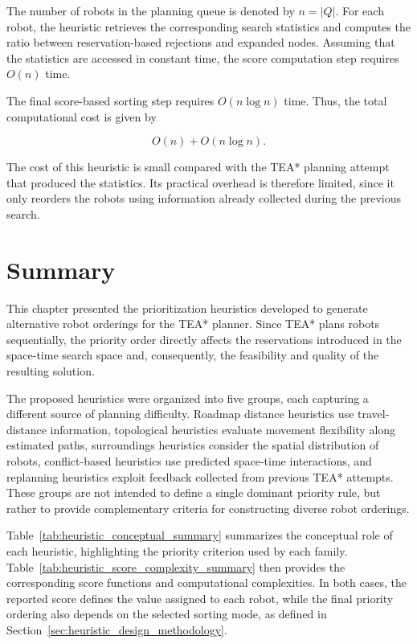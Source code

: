The number of robots in the planning queue is denoted by \(n = |Q|\). For each robot, the heuristic retrieves the corresponding search statistics and computes the ratio between reservation-based rejections and expanded nodes. Assuming that the statistics are accessed in constant time, the score computation step requires \(O(n)\) time.

The final score-based sorting step requires \(O(n \log n)\) time. Thus, the total computational cost is given by

\begin{equation}
\label{eq:exploration_conflicts_pressure_complexity}
    O(n) + O(n \log n).
\end{equation}

The cost of this heuristic is small compared with the TEA* planning attempt that produced the statistics. Its practical overhead is therefore limited, since it only reorders the robots using information already collected during the previous search.


\section{Summary}
\label{sec:heuristics_summary}
\hspace{\parindent}
This chapter presented the prioritization heuristics developed to generate alternative robot
orderings for the TEA* planner. Since TEA* plans robots sequentially, the priority order directly
affects the reservations introduced in the space-time search space and, consequently, the feasibility
and quality of the resulting solution.

The proposed heuristics were organized into five groups, each capturing a different source of
planning difficulty. Roadmap distance heuristics use travel-distance information, topological
heuristics evaluate movement flexibility along estimated paths, surroundings heuristics consider
the spatial distribution of robots, conflict-based heuristics use predicted space-time interactions,
and replanning heuristics exploit feedback collected from previous TEA* attempts. These groups are
not intended to define a single dominant priority rule, but rather to provide complementary criteria
for constructing diverse robot orderings.

Table~\ref{tab:heuristic_conceptual_summary} summarizes the conceptual role of each heuristic,
highlighting the priority criterion used by each family. Table~\ref{tab:heuristic_score_complexity_summary}
then provides the corresponding score functions and computational complexities. In both cases, the
reported score defines the value assigned to each robot, while the final priority ordering also
depends on the selected sorting mode, as defined in
Section~\ref{sec:heuristic_design_methodology}.

